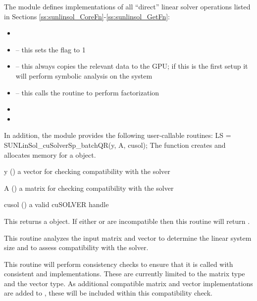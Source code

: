 The  module defines implementations of
all ``direct'' linear solver operations listed in
Sections \ref{ss:sunlinsol_CoreFn}-\ref{ss:sunlinsol_GetFn}:
\begin{itemize}
\item {}
\item {} -- this sets the
   flag to 1
\item {} -- this always copies the
  relevant {\sunmatsparse} data to the GPU; if this is the first setup
  it will perform symbolic analysis on the system
\item {} -- this calls the
   routine to perform factorization
\item {}
\item {}
\end{itemize}
In addition, the module provides the following user-callable routines:
{
  LS = SUNLinSol\_cuSolverSp\_batchQR(y, A, cusol);
}
{
  The function  creates and allocates memory for a
  {\sunlinsol} object.
}
{
  \begin{args}
  \item[y] ()
    a {\nveccuda} vector for checking compatibility with the solver
  \item[A] ()
    a {\sunmatsparse} matrix for checking compatibility with the solver
  \item[cusol] () a valid cuSOLVER handle
  \end{args}
}
{
  This returns a  object.  If either  or
   are incompatible then this routine will return .
}
{
  This routine analyzes the input matrix and vector to determine the
  linear system size and to assess compatibility with the solver.

  This routine will perform consistency checks to ensure that it is
  called with consistent {\nvector} and {\sunmatrix} implementations.
  These are currently limited to the  matrix type
  and the {\nveccuda} vector type. As additional compatible matrix and
  vector implementations are added to {\sundials}, these will be included
  within this compatibility check.
}
